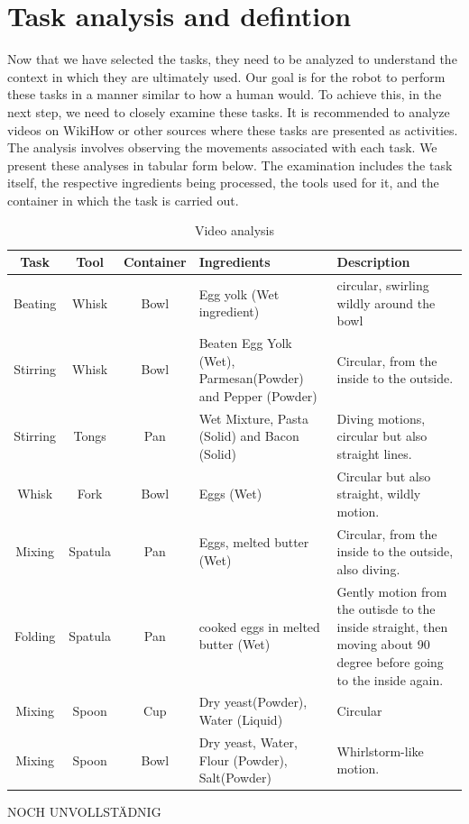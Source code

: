   \section*{Task analysis and defintion}
  Now that we have selected the tasks, they need to be analyzed to understand the context in which they are ultimately used. Our goal is for the robot to perform these tasks in a manner similar to how a human would. To achieve this, in the next step, we need to closely examine these tasks. It is recommended to analyze videos on WikiHow or other sources where these tasks are presented as activities. The analysis involves observing the movements associated with each task. We present these analyses in tabular form below. The examination includes the task itself, the respective ingredients being processed, the tools used for it, and the container in which the task is carried out.
    \begin{table}[H]
    \centering
    \begin{tabular}{|c|c|c|p{}|p{}|}
        \hline
        \textbf{Task} & \textbf{Tool} & \textbf{Container} & \textbf{Ingredients} & \textbf{Description} \\
        \hline
        Beating & Whisk & Bowl & Egg yolk (Wet ingredient) & circular, swirling wildly around the bowl \\
        \hline
        Stirring & Whisk & Bowl & Beaten Egg Yolk (Wet), Parmesan(Powder) and Pepper (Powder) & Circular, from the inside to the outside. \\
        \hline
        Stirring & Tongs & Pan & Wet Mixture, Pasta (Solid) and Bacon (Solid) & Diving motions, circular but also straight lines. \\
        \hline
        Whisk & Fork & Bowl & Eggs (Wet) & Circular but also straight, wildly motion. \\
        \hline
        Mixing & Spatula & Pan & Eggs, melted butter (Wet) & Circular, from the inside to the outside, also diving. \\
        \hline
        Folding & Spatula & Pan & cooked eggs in melted butter (Wet) & Gently motion from the outisde to the inside straight, then moving about 90 degree before going to the inside again. \\
        \hline
        Mixing & Spoon & Cup & Dry yeast(Powder), Water (Liquid) & Circular \\
        \hline
        Mixing & Spoon & Bowl & Dry yeast, Water, Flour (Powder), Salt(Powder) & Whirlstorm-like motion. \\
        \hline 
    \end{tabular}
    \caption{Video analysis}
    \label{tab:example}
  \end{table}
NOCH UNVOLLSTÄDNIG


